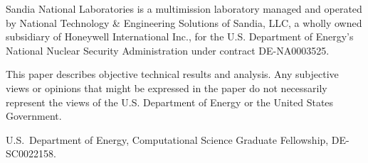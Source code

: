 Sandia National Laboratories is a multimission laboratory managed and operated by National Technology \& Engineering Solutions of Sandia, LLC, a wholly owned subsidiary of Honeywell International Inc., for the U.S. Department of Energy’s National Nuclear Security Administration under contract DE-NA0003525.

This paper describes objective technical results and analysis. Any subjective views or opinions that might be expressed in the paper do not necessarily represent the views of the U.S. Department of Energy or the United States Government.

U.S.\ Department of Energy, Computational Science Graduate Fellowship, DE-SC0022158. 
